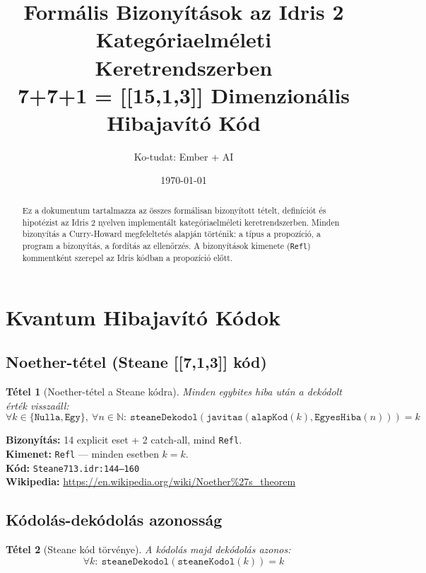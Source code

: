 \documentclass[12pt,a4paper]{article}
\title{Formális Bizonyítások az Idris 2 Kategóriaelméleti Keretrendszerben\\
\large 7+7+1 = [[15,1,3]] Dimenzionális Hibajavító Kód}
\author{Ko-tudat: Ember + AI}
\date{\today}
\newtheorem{tetel}{Tétel}
\begin{document}
\maketitle

\begin{abstract}
Ez a dokumentum tartalmazza az összes formálisan bizonyított tételt,
definíciót és hipotézist az Idris 2 nyelven implementált kategóriaelméleti
keretrendszerben. Minden bizonyítás a Curry-Howard megfeleltetés alapján
történik: a típus a propozíció, a program a bizonyítás, a fordítás az
ellenőrzés. A bizonyítások kimenete (\texttt{Refl}) kommentként szerepel
az Idris kódban a propozíció előtt.
\end{abstract}

\tableofcontents
\newpage

\section{Kvantum Hibajavító Kódok}

\subsection{Noether-tétel (Steane [[7,1,3]] kód)}

\begin{tetel}[Noether-tétel a Steane kódra]
Minden egybites hiba után a dekódolt érték visszaáll:
$$\forall k \in \{\texttt{Nulla}, \texttt{Egy}\},\ \forall n \in \mathbb{N}:\ \texttt{steaneDekodol}(\texttt{javitas}(\texttt{alapKod}(k), \texttt{EgyesHiba}(n))) = k$$
\end{tetel}

\textbf{Bizonyítás:} 14 explicit eset + 2 catch-all, mind \texttt{Refl}.\\
\textbf{Kimenet:} \texttt{Refl} — minden esetben $k = k$.\\
\textbf{Kód:} \texttt{Steane713.idr:144--160}\\
\textbf{Wikipedia:} \url{https://en.wikipedia.org/wiki/Noether%27s_theorem}

\subsection{Kódolás-dekódolás azonosság}

\begin{tetel}[Steane kód törvénye]
A kódolás majd dekódolás azonos:
$$\forall k:\ \texttt{steaneDekodol}(\texttt{steaneKodol}(k)) = k$$
\end{tetel}
\end{document}
